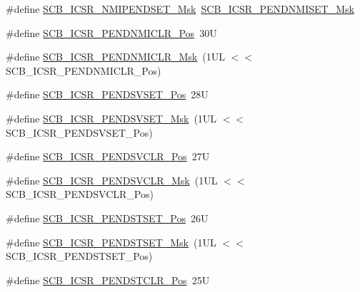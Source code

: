 \begin{DoxyCompactItemize}
\item 
\#define \mbox{\hyperlink{group___c_m_s_i_s___s_c_b_ga340e3f79e9c3607dee9f2c048b6b22e8}{S\+C\+B\+\_\+\+I\+C\+S\+R\+\_\+\+N\+M\+I\+P\+E\+N\+D\+S\+E\+T\+\_\+\+Msk}}~\mbox{\hyperlink{group___c_m_s_i_s___s_c_b_gadb4dbf66078026dedc24e8cb9a21b2b1}{S\+C\+B\+\_\+\+I\+C\+S\+R\+\_\+\+P\+E\+N\+D\+N\+M\+I\+S\+E\+T\+\_\+\+Msk}}
\item 
\#define \mbox{\hyperlink{group___c_m_s_i_s___s_c_b_gad4c1ddde49ff0d3ed1b843d14d38ebf1}{S\+C\+B\+\_\+\+I\+C\+S\+R\+\_\+\+P\+E\+N\+D\+N\+M\+I\+C\+L\+R\+\_\+\+Pos}}~30U
\item 
\#define \mbox{\hyperlink{group___c_m_s_i_s___s_c_b_gace870429ae27601613da7c6f6e53a18f}{S\+C\+B\+\_\+\+I\+C\+S\+R\+\_\+\+P\+E\+N\+D\+N\+M\+I\+C\+L\+R\+\_\+\+Msk}}~(1\+U\+L $<$$<$ S\+C\+B\+\_\+\+I\+C\+S\+R\+\_\+\+P\+E\+N\+D\+N\+M\+I\+C\+L\+R\+\_\+\+Pos)
\item 
\#define \mbox{\hyperlink{group___c_m_s_i_s___s_c_b_gab5ded23d2ab1d5ff7cc7ce746205e9fe}{S\+C\+B\+\_\+\+I\+C\+S\+R\+\_\+\+P\+E\+N\+D\+S\+V\+S\+E\+T\+\_\+\+Pos}}~28U
\item 
\#define \mbox{\hyperlink{group___c_m_s_i_s___s_c_b_ga1e40d93efb402763c8c00ddcc56724ff}{S\+C\+B\+\_\+\+I\+C\+S\+R\+\_\+\+P\+E\+N\+D\+S\+V\+S\+E\+T\+\_\+\+Msk}}~(1\+U\+L $<$$<$ S\+C\+B\+\_\+\+I\+C\+S\+R\+\_\+\+P\+E\+N\+D\+S\+V\+S\+E\+T\+\_\+\+Pos)
\item 
\#define \mbox{\hyperlink{group___c_m_s_i_s___s_c_b_gae218d9022288f89faf57187c4d542ecd}{S\+C\+B\+\_\+\+I\+C\+S\+R\+\_\+\+P\+E\+N\+D\+S\+V\+C\+L\+R\+\_\+\+Pos}}~27U
\item 
\#define \mbox{\hyperlink{group___c_m_s_i_s___s_c_b_ga4a901ace381d3c1c74ac82b22fae2e1e}{S\+C\+B\+\_\+\+I\+C\+S\+R\+\_\+\+P\+E\+N\+D\+S\+V\+C\+L\+R\+\_\+\+Msk}}~(1\+U\+L $<$$<$ S\+C\+B\+\_\+\+I\+C\+S\+R\+\_\+\+P\+E\+N\+D\+S\+V\+C\+L\+R\+\_\+\+Pos)
\item 
\#define \mbox{\hyperlink{group___c_m_s_i_s___s_c_b_ga9dbb3358c6167c9c3f85661b90fb2794}{S\+C\+B\+\_\+\+I\+C\+S\+R\+\_\+\+P\+E\+N\+D\+S\+T\+S\+E\+T\+\_\+\+Pos}}~26U
\item 
\#define \mbox{\hyperlink{group___c_m_s_i_s___s_c_b_ga7325b61ea0ec323ef2d5c893b112e546}{S\+C\+B\+\_\+\+I\+C\+S\+R\+\_\+\+P\+E\+N\+D\+S\+T\+S\+E\+T\+\_\+\+Msk}}~(1\+U\+L $<$$<$ S\+C\+B\+\_\+\+I\+C\+S\+R\+\_\+\+P\+E\+N\+D\+S\+T\+S\+E\+T\+\_\+\+Pos)
\item 
\#define \mbox{\hyperlink{group___c_m_s_i_s___s_c_b_gadbe25e4b333ece1341beb1a740168fdc}{S\+C\+B\+\_\+\+I\+C\+S\+R\+\_\+\+P\+E\+N\+D\+S\+T\+C\+L\+R\+\_\+\+Pos}}~25U

\end{DoxyCompactItemize}
